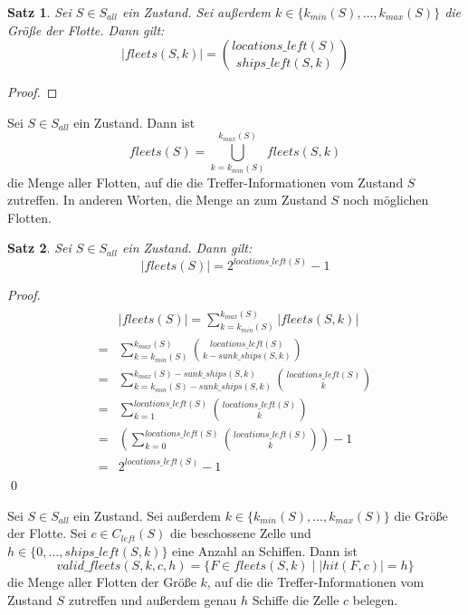\documentclass[a4paper,12pt]{llncs}
\numberwithin{equation}{section}
\newtheorem{satz}{Satz}
\begin{document}
\begin{satz}
Sei $S\in S_{all}$ ein Zustand.
Sei außerdem $k \in \{k_{min}(S), \dots, k_{max}(S)\}$ die Größe der Flotte.
Dann gilt:
\[
|fleets(S, k)|=\binom{locations\_left(S)}{ships\_left(S, k)}
\]
\end{satz}

\begin{proof}
\end{proof}

\begin{definition}
Sei $S\in S_{all}$ ein Zustand.
Dann ist
\[
fleets(S)=\bigcup_{k=k_{min}(S)}^{k_{max}(S)} fleets(S, k)
\]
die Menge aller Flotten, auf die die Treffer-Informationen vom Zustand $S$ zutreffen.
In anderen Worten, die Menge an zum Zustand $S$ noch möglichen Flotten.
\end{definition}

\begin{satz}
Sei $S\in S_{all}$ ein Zustand.
Dann gilt:
\[
|fleets(S)|=2^{locations\_left(S)} - 1
\]
\end{satz}

\begin{proof}
\begin{align}
\begin{split}
&|fleets(S)|=\sum_{k=k_{min}(S)}^{k_{max}(S)} |fleets(S, k)|\\
=&\sum_{k=k_{min}(S)}^{k_{max}(S)} \binom{locations\_left(S)}{k - sunk\_ships(S, k)} \\
=&\sum_{k=k_{min}(S)-sunk\_ships(S, k)}^{k_{max}(S) - sunk\_ships(S, k)} \binom{locations\_left(S)}{k} \\
=&\sum_{k=1}^{locations\_left(S)} \binom{locations\_left(S)}{k} \\
=&(\sum_{k=0}^{locations\_left(S)} \binom{locations\_left(S)}{k}) - 1\\
=&2^{locations\_left(S)} - 1
\end{split}
\end{align}
\qed
\end{proof}

\begin{definition}
Sei $S\in S_{all}$ ein Zustand.
Sei außerdem $k \in \{k_{min}(S), \dots, k_{max}(S)\}$ die Größe der Flotte.
Sei $c \in C_{left}(S)$ die beschossene Zelle und $h \in \{0, \dots, ships\_left(S, k)\}$ eine Anzahl an Schiffen.
Dann ist
\[
valid\_fleets(S,k,c,h)=\{F \in fleets(S, k) \mid |hit(F, c)|=h\}
\]
die Menge aller Flotten der Größe $k$, auf die die Treffer-Informationen vom Zustand $S$ zutreffen und außerdem genau $h$ Schiffe die Zelle $c$ belegen.
\end{definition}
\end{document}
